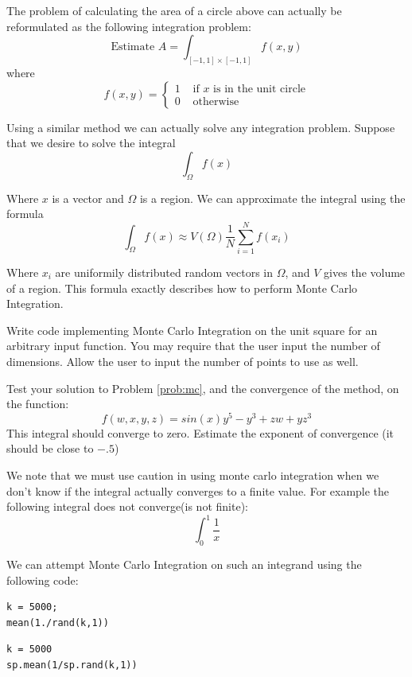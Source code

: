 The problem of calculating the area of a circle above can actually be reformulated as the following integration problem:
\[
\mbox{Estimate }A = \int_{[-1,1]\times[-1,1]} f(x,y)
\]
where
\[
f(x,y) = \begin{cases} 1 &\mbox{ if $x$ is in the unit circle} \\ 0 &\mbox{ otherwise} \end{cases}
\]

Using a similar method we can actually solve any integration problem. Suppose that we desire to solve the integral
\[
\int_\Omega f(x)
\]

Where $x$ is a vector and $\Omega$ is a region. We can approximate the integral using the formula
\[
\int_\Omega f(x) \approx V(\Omega) \frac{1}{N} \sum_{i=1}^N f(x_i)
\]

Where $x_i$ are uniformily distributed random vectors in $\Omega$, and $V$ gives the volume of a region. This formula exactly describes how to perform Monte Carlo Integration.

\begin{problem}
\label{prob:mc}
Write code implementing Monte Carlo Integration on the unit square for an arbitrary input function. You may require that the user input the number of dimensions. Allow the user to input the number of points to use as well.
\end{problem}

\begin{problem}
\label{prob:mc_test}
Test your solution to Problem \ref{prob:mc}, and the convergence of the method, on the function:
\[
f(w,x,y,z) = sin(x) y^5 -y^3 + zw + yz^3
\]
This integral should converge to zero. Estimate the exponent of convergence (it should be close to $-.5$)
\end{problem}

We note that we must use caution in using monte carlo integration when we don't know if the integral actually converges to a finite value. For example the following integral does not converge(is not finite):
\[
\int_0^1 \frac{1}{x}
\]

We can attempt Monte Carlo Integration on such an integrand using the following code:
\begin{matlab}
\begin{lstlisting}[style=matlab]
k = 5000;
mean(1./rand(k,1))
\end{lstlisting}
\end{matlab}
\begin{python}
\begin{lstlisting}[style=python]
k = 5000
sp.mean(1/sp.rand(k,1))
\end{lstlisting}
\end{python}

